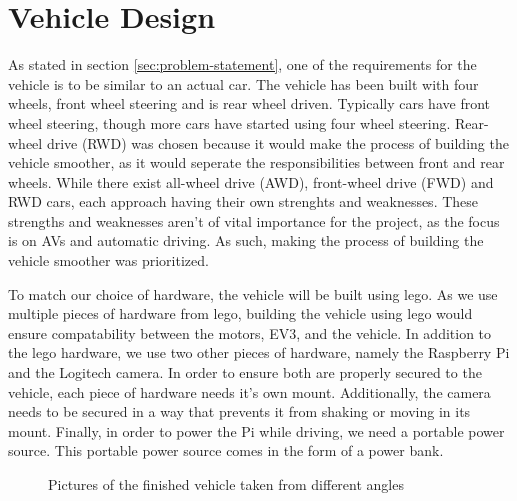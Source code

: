 \section{Vehicle Design}\label{sec:vehicle}%

As stated in section \autoref{sec:problem-statement}, one of the requirements for the vehicle is to be similar to an actual car.
The vehicle has been built with four wheels, front wheel steering and is rear wheel driven. 
Typically cars have front wheel steering, though more cars have started using four wheel steering.
Rear-wheel drive (RWD) was chosen because it would make the process of building the vehicle smoother, as it would seperate the responsibilities between front and rear wheels. 
While there exist all-wheel drive (AWD), front-wheel drive (FWD) and RWD cars, each approach having their own strenghts and weaknesses. 
These strengths and weaknesses aren't of vital importance for the project, as the focus is on AVs and automatic driving. 
As such, making the process of building the vehicle smoother was prioritized. \cite{moog_car_steering_2019, collins_car_steering_2018,gareffa_car_drive_2019, glon_car_drive_2019}

To match our choice of hardware, the vehicle will be built using lego. 
As we use multiple pieces of hardware from lego, building the vehicle using lego would ensure compatability between the motors, EV3, and the vehicle. 
In addition to the lego hardware, we use two other pieces of hardware, namely the Raspberry Pi and the Logitech camera.
In order to ensure both are properly secured to the vehicle, each piece of hardware needs it's own mount.
Additionally, the camera needs to be secured in a way that prevents it from shaking or moving in its mount. 
Finally, in order to power the Pi while driving, we need a portable power source. 
This portable power source comes in the form of a power bank. 

\begin{figure}[H]
    \centering
    \caption{Pictures of the finished vehicle taken from different angles}
    \label{fig:design-vehicleDesign-vehicleModel}
\end{figure}

